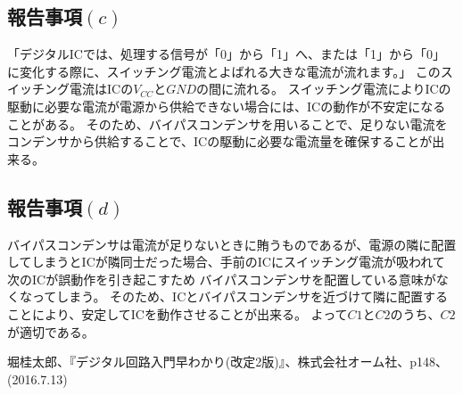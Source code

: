 \documentclass[a4paper,11pt]{ltjsarticle}
\begin{document}
\subsection{報告事項$(c)$}
「デジタルICでは、処理する信号が「0」から「1」へ、または「1」から「0」に変化する際に、スイッチング電流とよばれる大きな電流が流れます。」\cite{参照ラベル名1}
このスイッチング電流はICの$V_{CC}$と$GND$の間に流れる。
スイッチング電流によりICの駆動に必要な電流が電源から供給できない場合には、ICの動作が不安定になることがある。
そのため、バイパスコンデンサを用いることで、足りない電流をコンデンサから供給することで、ICの駆動に必要な電流量を確保することが出来る。
\subsection{報告事項$(d)$}
バイパスコンデンサは電流が足りないときに賄うものであるが、電源の隣に配置してしまうとICが隣同士だった場合、手前のICにスイッチング電流が吸われて次のICが誤動作を引き起こすため
バイパスコンデンサを配置している意味がなくなってしまう。
そのため、ICとバイパスコンデンサを近づけて隣に配置することにより、安定してICを動作させることが出来る。
よって$C1$と$C2$のうち、$C2$が適切である。



\begin{thebibliography}{9}
   堀桂太郎、『デジタル回路入門早わかり(改定2版)』、株式会社オーム社、p148、(2016.7.13)
\end{thebibliography}
\end{document}
